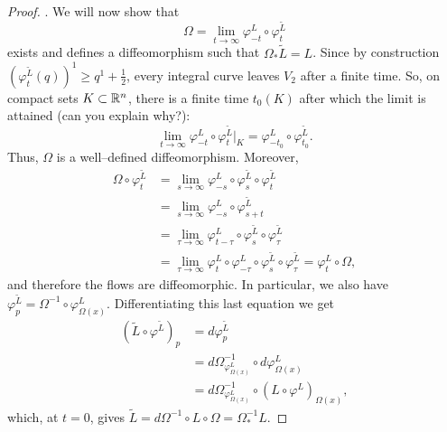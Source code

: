 \begin{proof}
  . We will now show that
  \begin{equation}
    \Omega = \lim_{t\to\infty} \varphi_{-t}^L \circ \varphi_t^{\widetilde{L}}
  \end{equation}
  exists and defines a diffeomorphism such that $\Omega_* \widetilde{L} = L$.
  Since by construction $(\varphi_t^{\widetilde{L}}(q))^1 \geq q^1 + \frac12$, every integral curve leaves $V_2$ after a finite time.
  So, on compact sets $K\subset\mathbb{R}^n$, there is a finite time $t_0(K)$ after which the limit is attained (can you explain why?):
  \begin{equation}
    \lim_{t\to\infty} \varphi_{-t}^L \circ \varphi_t^{\widetilde{L}}\Big|_K = \varphi_{-t_0}^L \circ \varphi_{t_0}^{\widetilde{L}}.
  \end{equation}
  Thus, $\Omega$ is a well--defined diffeomorphism.
  Moreover,
  \begin{align}
    \Omega \circ \varphi^{\widetilde{L}}_t &= \lim_{s\to\infty} \varphi_{-s}^L \circ \varphi^{\widetilde{L}}_s \circ \varphi^{\widetilde{L}}_t \\
    &= \lim_{s\to\infty} \varphi_{-s}^L \circ \varphi^{\widetilde{L}}_{s+t} \\
    &= \lim_{\tau\to\infty} \varphi_{t-\tau}^L \circ \varphi^{\widetilde{L}}_s \circ \varphi^{\widetilde{L}}_\tau \\
    &= \lim_{\tau\to\infty} \varphi_{t}^L \circ \varphi_{-\tau}^L \circ \varphi^{\widetilde{L}}_s \circ \varphi^{\widetilde{L}}_\tau = \varphi_t^L \circ \Omega,
  \end{align}
  and therefore the flows are diffeomorphic.
  In particular, we also have $\varphi_p^{\widetilde{L}} = \Omega^{-1} \circ \varphi^L_{\Omega(x)}$.
  Differentiating this last equation we get
  \begin{align}
    (\widetilde{L} \circ \varphi^{\widetilde{L}})_p &= d\varphi^{\widetilde{L}}_p \\
    &= d\Omega^{-1}_{\varphi^L_{\Omega(x)}} \circ d\varphi^L_{\Omega(x)} \\
    &= d\Omega^{-1}_{\varphi^L_{\Omega(x)}} \circ (L \circ \varphi^L)_{\Omega(x)},
  \end{align}
    which, at $t=0$, gives $\widetilde{L} = d\Omega^{-1} \circ L \circ \Omega = \Omega^{-1}_* L$.
\end{proof}


